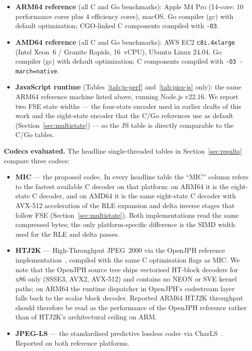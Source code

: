 \documentclass[journal]{IEEEtran}
\begin{document}
\begin{itemize}
  \item \textbf{ARM64 reference} (all C and Go benchmarks): Apple M4 Pro
  (14-core: 10 performance cores plus 4 efficiency cores), macOS. Go
  compiler (gc) with default optimization; CGO-linked C components compiled
  with \texttt{-O3}.
  \item \textbf{AMD64 reference} (all C and Go benchmarks): AWS EC2
  \texttt{c8i.4xlarge} (Intel Xeon~6 / Granite Rapids, 16~vCPU), Ubuntu
  Linux 24.04. Go compiler (gc) with default optimization; C components
  compiled with \texttt{-O3 -march=native}.
  \item \textbf{JavaScript runtime} (Tables~\ref{tab:js-perf}
  and~\ref{tab:pics-js} only): the same ARM64 reference machine listed
  above, running Node.js v22.16. We report two FSE state widths --- the
  four-state encoder used in earlier drafts of this work and the
  eight-state encoder that the C/Go references use as default
  (Section~\ref{sec:multistate}) --- so the JS table is directly
  comparable to the C/Go tables.
\end{itemize}

\textbf{Codecs evaluated.} The headline single-threaded tables in
Section~\ref{sec:results} compare three codecs:

\begin{itemize}
  \item \textbf{MIC} --- the proposed codec. In every headline table the
  ``MIC'' column refers to the fastest available C decoder on that
  platform: on ARM64 it is the eight-state C decoder, and on AMD64 it is
  the same eight-state C decoder with AVX-512 acceleration of the RLE
  expansion and delta inverse stages that follow FSE
  (Section~\ref{sec:multistate}). Both implementations read the same
  compressed bytes; the only platform-specific difference is the SIMD
  width used for the RLE and delta passes.
  \item \textbf{HTJ2K} --- High-Throughput JPEG~2000 via the OpenJPH
  reference implementation~\cite{openjph}, compiled with the same C
  optimisation flags as MIC. We note that the OpenJPH source tree ships
  vectorised HT-block decoders for x86 only (SSSE3, AVX2, AVX-512) and
  contains no NEON or SVE kernel paths; on ARM64 the runtime dispatcher
  in OpenJPH's codestream layer falls back to the scalar block decoder.
  Reported ARM64 HTJ2K throughput should therefore be read as the
  performance of the OpenJPH reference rather than of HTJ2K's
  architectural ceiling on ARM.
  \item \textbf{JPEG-LS} --- the standardised predictive lossless codec
  via CharLS~\cite{charls}. Reported on both reference platforms.
\end{itemize}
\end{document}
